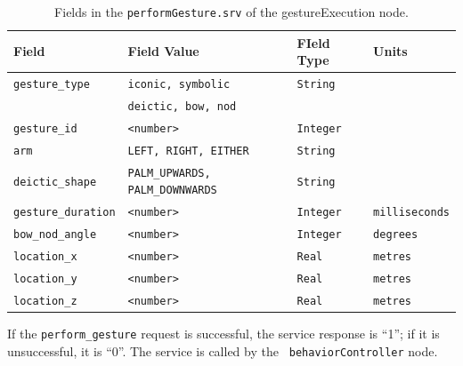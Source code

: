 \documentclass{CSSRforAfrica}
\begin{document}
\begin{longtable}[c]{|l|p{3.5cm}|l|l|}
    \caption{Fields in the \texttt{performGesture.srv} of the gestureExecution node.} \label{tab:Gesture.msg_field} \\
    \hline
    \rowcolor{gray!30}
    \footnotesize{\textbf{Field}} & \footnotesize{\textbf{Field Value}} & \footnotesize{\textbf{FIeld Type}} & \footnotesize{\textbf{Units}}\\ \hline
    \endhead %
    
    \footnotesize{\texttt{gesture\_type}} & \footnotesize{\texttt{iconic, symbolic}} & \footnotesize{\texttt{String}} & \footnotesize{}  \\ 
   \footnotesize{} & \footnotesize{\texttt{deictic, bow, nod}} & \footnotesize{} & \footnotesize{}  \\\hline
\footnotesize{\texttt{gesture\_id}} & \footnotesize{\texttt{<number>}} & \footnotesize{\texttt{Integer}} & \footnotesize{}  \\ \hline
\footnotesize{\texttt{arm}} & \footnotesize{\texttt{LEFT, RIGHT, EITHER}} & \footnotesize{\texttt{String}} & \footnotesize{}  \\ \hline
\footnotesize{\texttt{deictic\_shape}} & \footnotesize{\texttt{PALM\_UPWARDS, PALM\_DOWNWARDS}} & \footnotesize{\texttt{String}} & \footnotesize{}  \\ \hline
\footnotesize{\texttt{gesture\_duration}} & \footnotesize{\texttt{<number>}} & \footnotesize{\texttt{Integer}} & \footnotesize{\texttt{milliseconds}}  \\ \hline
\footnotesize{\texttt{bow\_nod\_angle}} & \footnotesize{\texttt{<number>}} & \footnotesize{\texttt{Integer}} & \footnotesize{\texttt{degrees}}  \\ \hline
\footnotesize{\texttt{location\_x}} & \footnotesize{\texttt{<number>}} & \footnotesize{\texttt{Real}} & \footnotesize{\texttt{metres}}  \\ \hline
\footnotesize{\texttt{location\_y}} & \footnotesize{\texttt{<number>}} & \footnotesize{\texttt{Real}} & \footnotesize{\texttt{metres}}  \\ \hline
\footnotesize{\texttt{location\_z}} & \footnotesize{\texttt{<number>}} & \footnotesize{\texttt{Real}} & \footnotesize{\texttt{metres}}  \\ \hline
\end{longtable}

If the \texttt{perform\_gesture} request is successful, the service response is “1”; if it is unsuccessful, it is “0”. The service is called by the \texttt{ behaviorController} node.
\end{document}
